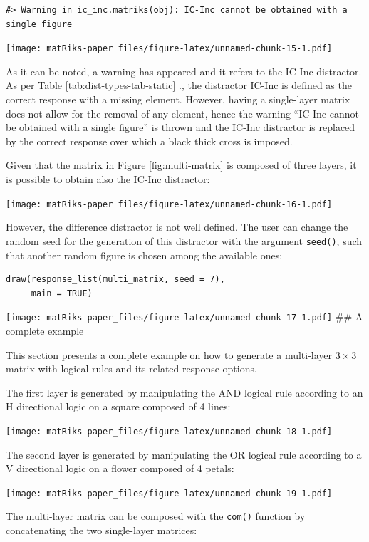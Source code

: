\begin{verbatim}
#> Warning in ic_inc.matriks(obj): IC-Inc cannot be obtained with a single figure
\end{verbatim}

\texttt{[image: matRiks-paper\_files/figure-latex/unnamed-chunk-15-1.pdf]}

As it can be noted, a warning has appeared and it refers to the IC-Inc distractor. As per Table \ref{tab:dist-types-tab-static} ., the distractor IC-Inc is defined as the correct response with a missing element. However, having a single-layer matrix does not allow for the removal of any element, hence the warning ``IC-Inc cannot be obtained with a single figure'' is thrown and the IC-Inc distractor is replaced by the correct response over which a black thick cross is imposed.

Given that the matrix in Figure \ref{fig:multi-matrix} is composed of three layers, it is possible to obtain also the IC-Inc distractor:

\texttt{[image: matRiks-paper\_files/figure-latex/unnamed-chunk-16-1.pdf]}

However, the difference distractor is not well defined. The user can change the random seed for the generation of this distractor with the argument \texttt{seed()}, such that another random figure is chosen among the available ones:

\begin{verbatim}
draw(response_list(multi_matrix, seed = 7),
     main = TRUE)
\end{verbatim}

\texttt{[image: matRiks-paper\_files/figure-latex/unnamed-chunk-17-1.pdf]}
\#\# A complete example

This section presents a complete example on how to generate a multi-layer \(3 \times 3\) matrix with logical rules and its related response options.

The first layer is generated by manipulating the AND logical rule according to an H directional logic on a square composed of 4 lines:

\texttt{[image: matRiks-paper\_files/figure-latex/unnamed-chunk-18-1.pdf]}

The second layer is generated by manipulating the OR logical rule according to a V directional logic on a flower composed of 4 petals:

\texttt{[image: matRiks-paper\_files/figure-latex/unnamed-chunk-19-1.pdf]}

The multi-layer matrix can be composed with the \texttt{com()} function by concatenating the two single-layer matrices:


